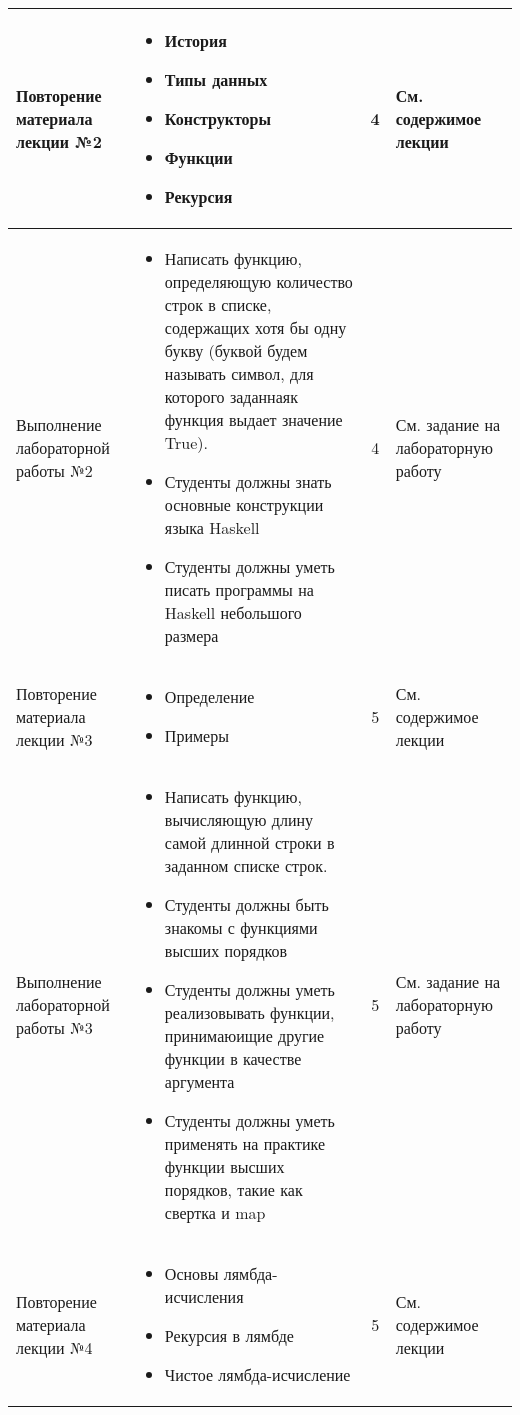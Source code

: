 \begin{landscape}
\begin{center}
\begin{longtable}{|p{}|p{}|c|p{}|}
Повторение материала лекции №2 & \begin{itemize}
\item История\item Типы данных\item Конструкторы\item Функции\item Рекурсия
\end{itemize} & 4 & См. содержимое лекции\\\hline
Выполнение лабораторной работы №2 & \begin{itemize}
\item Написать функцию, определяющую количество строк в списке, содержащих хотя бы одну букву (буквой будем называть символ, для которого заданнаяк функция выдает значение True).\item Студенты должны знать основные конструкции языка Haskell\item Студенты должны уметь писать программы на Haskell небольшого размера
\end{itemize} & 4 & См. задание на лабораторную работу\\\hline
Повторение материала лекции №3 & \begin{itemize}
\item Определение\item Примеры
\end{itemize} & 5 & См. содержимое лекции\\\hline
Выполнение лабораторной работы №3 & \begin{itemize}
\item Написать функцию, вычисляющую длину самой длинной строки в заданном списке строк.\item Студенты должны быть знакомы с функциями высших порядков\item Студенты должны уметь реализовывать функции, принимаюищие другие функции в качестве аргумента\item Студенты должны уметь применять на практике функции высших порядков, такие как свертка и map
\end{itemize} & 5 & См. задание на лабораторную работу\\\hline
Повторение материала лекции №4 & \begin{itemize}
\item Основы лямбда-исчисления\item Рекурсия в лямбде\item Чистое лямбда-исчисление
\end{itemize} & 5 & См. содержимое лекции\\\hline

\end{longtable}
\end{center}
\end{landscape}
